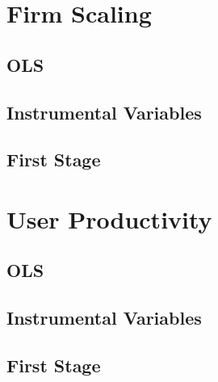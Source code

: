 \documentclass{article}
\newcommand{\cleanedresultsdir}{../results/cleaned}
\begin{document}

\clearpage
\section{Firm Scaling}
\label{sec:firm_scaling}

\subsection{OLS}


\subsection{Instrumental Variables}


\subsection{First Stage}



\clearpage
\section{User Productivity}
\label{sec:user_productivity}

\subsection{OLS}


\subsection{Instrumental Variables}


\subsection{First Stage}

\end{document}
